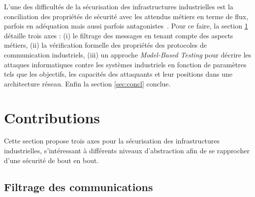 \documentclass{article}
\begin{document}
L'une des difficultés de la sécurisation des infrastructures industrielles est la
conciliation des propriétés de sécurité avec les attendus métiers en terme de
flux, parfois en adéquation mais aussi parfois antagonistes~\cite{Pie10}.
Pour ce faire, la section \ref{sec:contribs} détaille trois axes :
(i) le filtrage des messages en tenant compte des aspects métiers, (ii) la
vérification formelle des propriétés des protocoles de communication industriels,
(iii) un approche {\em Model-Based Testing} pour décrire les attaques
informatiques contre les systèmes industriels en fonction de paramètres tels que
les objectifs, les capacités des attaquants et leur positions dans une
architecture réseau.
Enfin la section \ref{sec:concl} conclue.

\section{Contributions}\label{sec:contribs}

Cette section propose trois axes pour la sécurisation des infrastructures
industrielles, s'intéressant à différents niveaux d'abstraction afin de se
rapprocher d'une sécurité de bout en bout.

\subsection{Filtrage des communications}\label{sec:aramis}
\end{document}
